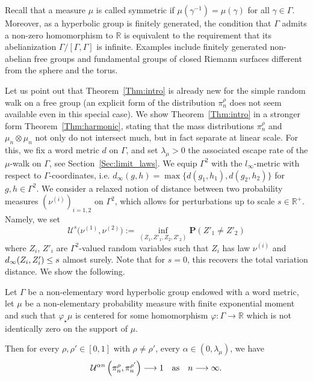 \documentclass[AHL,Unicode,longabstracts,published]{cedram}
\newcommand{\cU}{\mathcal{U}}
\newcommand{\R}{\mathbb{R}}
\newcommand{\Pb}{\mathbf{P}}
\renewcommand{\(}{\left(}
\renewcommand{\)}{\right)}
\renewcommand*{\to}{\mathchoice{\longrightarrow}{\rightarrow}{\rightarrow}{\rightarrow}}
\begin{document}
Recall that a measure $\mu$ is called symmetric if $\mu(\gamma^{-1})=\mu(\gamma)$ for all $\gamma \in \Gamma$. Moreover, as a hyperbolic group is finitely generated, the condition that $\Gamma$ admits a non-zero homomorphism to $\R$ is equivalent to the requirement that its abelianization $\Gamma/[\Gamma, \Gamma]$ is infinite. Examples include finitely generated non-abelian free groups and fundamental groups of closed Riemann surfaces different from the sphere and the torus.

Let us point out that Theorem~\ref{Thm:intro} is already new for the simple random walk on a free group (an explicit form of the distribution $\pi^\rho_n$ does not seem available even in this special case). We show Theorem~\ref{Thm:intro} in a stronger form Theorem~\ref{Thm:harmonic}, stating that the mass distributions $\pi^\rho_n$ and $\mu_n\otimes\mu_n$ not only do not intersect much, but in fact separate at linear scale. For this, we fix a word metric $d$ on $\Gamma$, and set $\lambda_{\mu}>0$ the associated escape rate of the $\mu$-walk on $\Gamma$, see Section~\ref{Sec:limit_laws}. We equip $\Gamma^2$ with the $l_{\infty}$-metric with respect to $\Gamma$-coordinates, i.e. $d_\infty(g,h)=\max\{d(g_{1},h_{1}), d(g_{2},h_{2})\}$ for $g,h\in \Gamma^2$. We consider a relaxed notion of distance between two probability measures $(\nu^{(i)})_{i=1,2}$ on $\Gamma^2$, which allows for perturbations up to scale $s\in \R^+$. Namely, we set
\[
\cU^s\bigl(\nu^{(1)}, \nu^{(2)}\bigr) :=\inf_{\left(Z_{1},Z'_{1}, Z_{2}, Z'_{2}\right)} \Pb\left(Z'_{1}\neq Z'_{2}\right)
\]
where $Z_{i}$, $Z'_{i}$ are $\Gamma^2$-valued random variables such that $Z_{i}$ has law $\nu^{(i)}$ and $d_{\infty}(Z_{i},\linebreak Z'_{i})\leq s$ almost surely. Note that for $s=0$, this recovers the total variation distance. We show the following.

\begin{theo}\label{Thm:harmonic}
Let $\Gamma$ be a non-elementary word hyperbolic group endowed with a word metric, let $\mu$ be a non-elementary probability measure with finite exponential moment and such that $\varphi_{\star}\mu$ is centered for some homomorphism $\varphi : \Gamma\rightarrow \R$ which is not identically zero on the support of $\mu$.

Then for every $\rho, \rho' \in [0, 1]$ with $\rho \neq \rho'$, every $\alpha\in (0, \lambda_{\mu})$, we have
\[
\cU^{\alpha n}\left(\pi_{n}^\rho, \pi_{n}^{\rho'}\right) \to 1 \quad \text{as}\quad n \to \infty.
\]
\end{theo}
\end{document}

